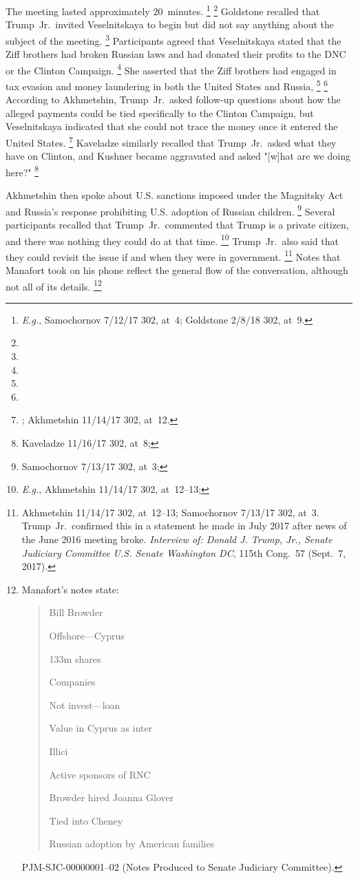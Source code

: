 The meeting lasted approximately 20~minutes.%
\footnote{\textit{E.g.}, Samochornov 7/12/17 302, at~4; Goldstone 2/8/18 302, at~9.}
\footnote{}
 Goldstone recalled that Trump~Jr.\ invited Veselnitskaya to begin but did not say anything about the subject of the meeting.%
\footnote{}
Participants agreed that Veselnitskaya stated that the Ziff brothers had broken Russian laws and had donated their profits to the DNC or the Clinton Campaign.%
\footnote{}
She asserted that the Ziff brothers had engaged in tax evasion and money laundering in both the United States and Russia,%
\footnote{}
\footnote{}
According to Akhmetshin, Trump~Jr.\ asked follow-up questions about how the alleged payments could be tied specifically to the Clinton Campaign, but Veselnitskaya indicated that she could not trace the money once it entered the United States.%
\footnote{; Akhmetshin 11/14/17 302, at~12.}
Kaveladze similarly recalled that Trump~Jr.\ asked what they have on Clinton, and Kushner became aggravated and asked "[w]hat are we doing here?"%
\footnote{Kaveladze 11/16/17 302, at~8;
}

Akhmetshin then spoke about U.S. sanctions imposed under the Magnitsky Act and Russia's response prohibiting U.S. adoption of Russian children.%
\footnote{Samochornov 7/13/17 302, at~3;
}
Several participants recalled that Trump~Jr.\ commented that Trump is a private citizen, and there was nothing they could do at that time.%
\footnote{\textit{E.g.}, Akhmetshin 11/14/17 302, at~12--13;
}
Trump~Jr.\ also said that they could revisit the issue if and when they were in government.%
\footnote{Akhmetshin 11/14/17 302, at~12--13;
Samochornov 7/13/17 302, at~3.
Trump~Jr.\ confirmed this in a statement he made in July 2017 after news of the June 2016 meeting broke.
\textit{Interview of: Donald J. Trump, Jr., Senate Judiciary Committee U.S. Senate Washington DC}, 115th Cong.~57 (Sept.~7, 2017).}
Notes that Manafort took on his phone reflect the general flow of the conversation, although not all of its details.%
\footnote{Manafort's notes state:

\begin{quote}
Bill Browder

Offshore---Cyprus

133m shares

Companies

Not invest---loan

Value in Cyprus as inter

Illici

Active sponsors of RNC

Browder hired Joanna Glover

Tied into Cheney

Russian adoption by American families
\end{quote}

PJM-SJC-00000001--02 (Notes Produced to Senate Judiciary Committee).}

